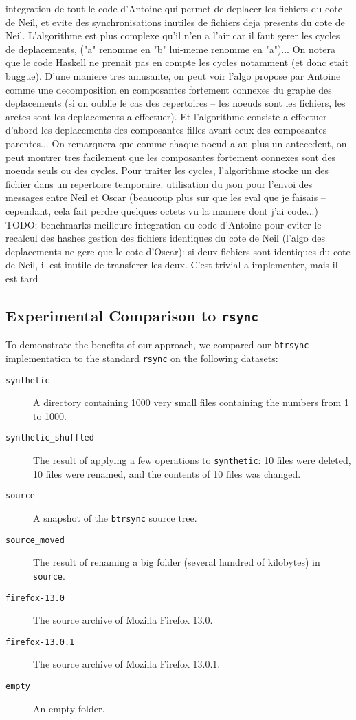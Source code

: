 \documentclass[11pt]{llncs}
\newcommand{\btrsync}{\texttt{btrsync}\xspace}
\newcommand{\rsync}{\texttt{rsync}\xspace}
\begin{document}
integration de tout le code d'Antoine qui permet de deplacer les fichiers du cote de Neil, et evite des synchronisations inutiles de fichiers deja presents du cote de Neil. L'algorithme est plus complexe qu'il n'en a l'air car il faut gerer les cycles de deplacements, ("a" renomme en "b" lui-meme renomme en "a")... On notera que le code Haskell ne prenait pas en compte les cycles notamment (et donc etait buggue).
D'une maniere tres amusante, on peut voir l'algo propose par Antoine comme une decomposition en composantes fortement connexes du graphe des deplacements (si on oublie le cas des repertoires – les noeuds sont les fichiers, les aretes sont les deplacements a effectuer). Et l'algorithme consiste a effectuer d'abord les deplacements des composantes filles avant ceux des composantes parentes...
On remarquera que comme chaque noeud a au plus un antecedent, on peut montrer tres facilement que les composantes fortement connexes sont des noeuds seuls ou des cycles.
Pour traiter les cycles, l'algorithme stocke un des fichier dans un repertoire temporaire.
utilisation du json pour l'envoi des messages entre Neil et Oscar (beaucoup plus sur que les eval que je faisais – cependant, cela fait perdre quelques octets vu la maniere dont j'ai code...)
TODO:
benchmarks
meilleure integration du code d'Antoine pour eviter le recalcul des hashes
gestion des fichiers identiques du cote de Neil (l'algo des deplacements ne gere que le cote d'Oscar): si deux fichiers sont identiques du cote de Neil, il est inutile de transferer les deux. C'est trivial a implementer, mais il est tard


\subsection{Experimental Comparison to \rsync}

To demonstrate the benefits of our approach, we compared our \btrsync
implementation to the standard \rsync on the following datasets:

\begin{description}
  \item[\texttt{synthetic}] A directory containing 1000 very small files
    containing the numbers from 1 to 1000.
  \item[\texttt{synthetic\_shuffled}] The result of applying a few operations to
    \texttt{synthetic}: 10 files were deleted, 10 files were renamed, and the
    contents of 10 files was changed.
  \item[\texttt{source}] A snapshot of the \btrsync source tree.
  \item[\texttt{source\_moved}] The result of renaming a big folder (several
    hundred of kilobytes) in \texttt{source}.
  \item[\texttt{firefox-13.0}] The source archive of Mozilla Firefox 13.0.
  \item[\texttt{firefox-13.0.1}] The source archive of Mozilla Firefox 13.0.1.
  \item[\texttt{empty}] An empty folder.
\end{description}
\end{document}
